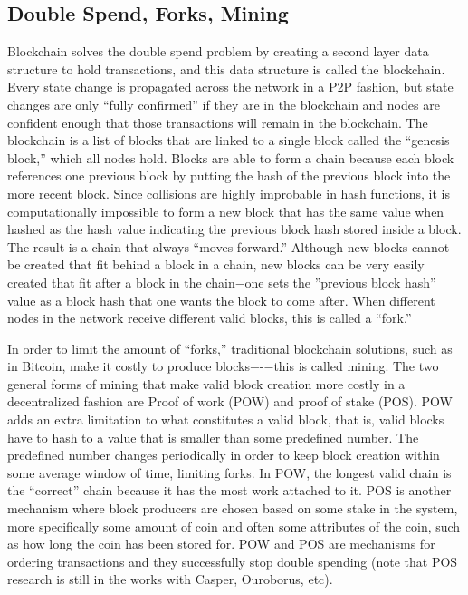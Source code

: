 \documentclass[letterpaper, 10 pt, conference]{ieeeconf}  %
\begin{document}
\subsection{Double Spend, Forks, Mining}
Blockchain solves the double spend problem by creating a second layer data structure to hold transactions, and this data structure is called the blockchain. Every state change is propagated across the network in a P2P fashion, but state changes are only “fully confirmed” if they are in the blockchain and nodes are confident enough that those transactions will remain in the blockchain. The blockchain is a list of blocks that are linked to a single block called the “genesis block,” which all nodes hold. Blocks are able to form a chain because each block references one previous block by putting the hash of the previous block into the more recent block. Since collisions are highly improbable in hash functions, it is computationally impossible to form a new block that has the same value when hashed as the hash value indicating the previous block hash stored inside a block. The result is a chain that always “moves forward.” Although new blocks cannot be created that fit behind a block in a chain, new blocks can be very easily created that fit after a block in the chain−one sets the ”previous block hash” value as a block hash that one wants the block to come after. When different nodes in the network receive different valid blocks, this is called a “fork.” 

In order to limit the amount of “forks,” traditional blockchain solutions, such as in Bitcoin, make it costly to produce blocks−-−this is called mining. The two general forms of mining that make valid block creation more costly in a decentralized fashion are Proof of work (POW) and proof of stake (POS). POW adds an extra limitation to what constitutes a valid block, that is, valid blocks have to hash to a value that is smaller than some predefined number. The predefined number changes periodically in order to keep block creation within some average window of time, limiting forks. In POW, the longest valid chain is the “correct” chain because it has the most work attached to it. POS is another mechanism where block producers are chosen based on some stake in the system, more specifically some amount of coin and often some attributes of the coin, such as how long the coin has been stored for. POW and POS are mechanisms for ordering transactions and they successfully stop double spending (note that POS research is still in the works with Casper, Ouroborus, etc).
\end{document}
